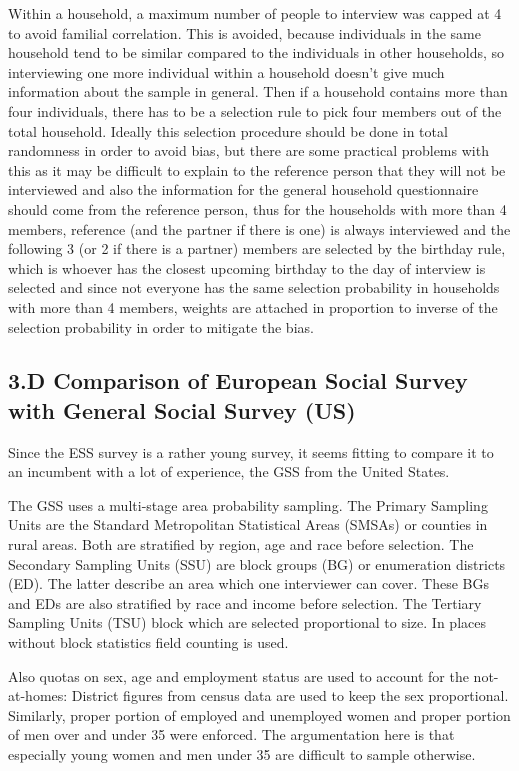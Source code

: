 Within a household, a maximum number of people to interview was capped at 4 to avoid familial correlation. This is avoided, because individuals in the same household tend to be similar compared to the individuals in other households, so interviewing one more individual within a household doesn't give much information about the sample in general. Then if a household contains more than four individuals, there has to be a selection rule to pick four members out of the total household. Ideally this selection procedure should be done in total randomness in order to avoid bias, but there are some practical problems with this as it may be difficult to explain to the reference person that they will not be interviewed and also the information for the general household questionnaire should come from the reference person, thus for the households with more than 4 members, reference (and the partner if there is one) is always interviewed and the following 3 (or 2 if there is a partner) members are selected by the birthday rule, which is whoever has the closest upcoming birthday to the day of interview is selected and since not everyone has the same selection probability in households with more than 4 members, weights are attached in proportion to inverse of the selection probability in order to mitigate the bias.

\subsection*{3.D Comparison of European Social Survey with General Social Survey (US) }

Since the ESS survey is a rather young survey, it seems fitting to compare it to an incumbent with a lot of experience, the GSS from the United States.

The GSS uses a multi-stage area probability sampling.
The Primary Sampling Units are the Standard Metropolitan Statistical Areas (SMSAs) or counties in rural areas. Both are stratified by region, age and race before selection. 
The Secondary Sampling Units (SSU) are block groups (BG) or enumeration districts (ED). The latter describe an area which one interviewer can cover. These BGs and EDs are also stratified by race and income before selection. The Tertiary Sampling Units  (TSU) block which are selected proportional to size. In places without block statistics field counting is used. 

Also quotas on sex, age and employment status are used to account for the not-at-homes: District figures from census data are used to keep the sex proportional. Similarly, proper portion of employed and unemployed women and proper portion of men over and under 35 were enforced. The argumentation here is that especially young women and men under 35 are difficult to sample otherwise. 

